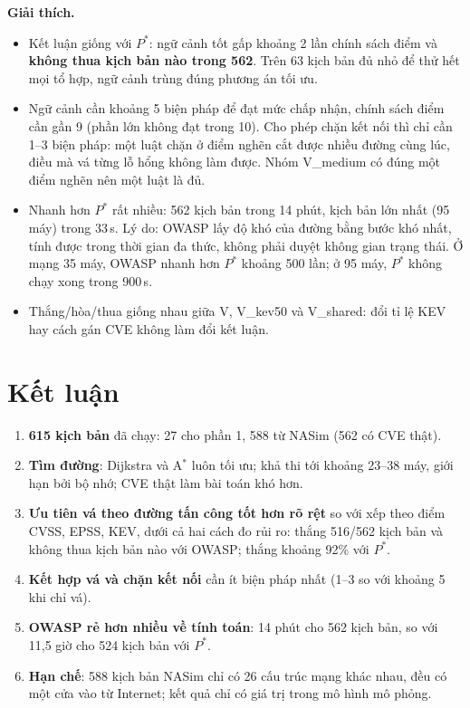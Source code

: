 \documentclass[11pt,a4paper]{article}
\begin{document}
\textbf{Giải thích.}
\begin{itemize}
  \item Kết luận giống với $P^{*}$: ngữ cảnh tốt gấp khoảng 2 lần chính sách điểm và \textbf{không thua kịch bản nào trong 562}. Trên 63 kịch bản đủ nhỏ để thử hết mọi tổ hợp, ngữ cảnh trùng đúng phương án tối ưu.
  \item Ngữ cảnh cần khoảng 5 biện pháp để đạt mức chấp nhận, chính sách điểm cần gần 9 (phần lớn không đạt trong 10). Cho phép chặn kết nối thì chỉ cần 1--3 biện pháp: một luật chặn ở điểm nghẽn cắt được nhiều đường cùng lúc, điều mà vá từng lỗ hổng không làm được. Nhóm V\_medium có đúng một điểm nghẽn nên một luật là đủ.
  \item Nhanh hơn $P^{*}$ rất nhiều: 562 kịch bản trong 14 phút, kịch bản lớn nhất (95 máy) trong 33\,s. Lý do: OWASP lấy độ khó của đường bằng bước khó nhất, tính được trong thời gian đa thức, không phải duyệt không gian trạng thái. Ở mạng 35 máy, OWASP nhanh hơn $P^{*}$ khoảng 500 lần; ở 95 máy, $P^{*}$ không chạy xong trong 900\,s.
  \item Thắng/hòa/thua giống nhau giữa V, V\_kev50 và V\_shared: đổi tỉ lệ KEV hay cách gán CVE không làm đổi kết luận.
\end{itemize}

\section{Kết luận}

\begin{enumerate}
  \item \textbf{615 kịch bản} đã chạy: 27 cho phần 1, 588 từ NASim (562 có CVE thật).
  \item \textbf{Tìm đường}: Dijkstra và A$^{*}$ luôn tối ưu; khả thi tới khoảng 23--38 máy, giới hạn bởi bộ nhớ; CVE thật làm bài toán khó hơn.
  \item \textbf{Ưu tiên vá theo đường tấn công tốt hơn rõ rệt} so với xếp theo điểm CVSS, EPSS, KEV, dưới cả hai cách đo rủi ro: thắng 516/562 kịch bản và không thua kịch bản nào với OWASP; thắng khoảng 92\% với $P^{*}$.
  \item \textbf{Kết hợp vá và chặn kết nối} cần ít biện pháp nhất (1--3 so với khoảng 5 khi chỉ vá).
  \item \textbf{OWASP rẻ hơn nhiều về tính toán}: 14 phút cho 562 kịch bản, so với 11,5 giờ cho 524 kịch bản với $P^{*}$.
  \item \textbf{Hạn chế}: 588 kịch bản NASim chỉ có 26 cấu trúc mạng khác nhau, đều có một cửa vào từ Internet; kết quả chỉ có giá trị trong mô hình mô phỏng.
\end{enumerate}
\end{document}
